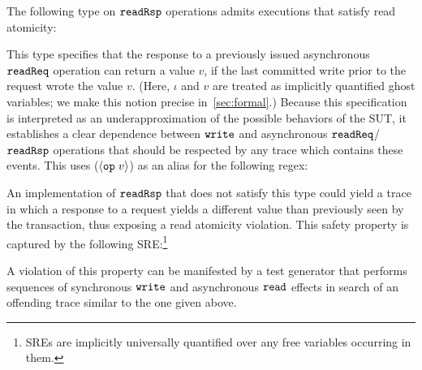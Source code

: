   The following \tyName{} type on $\boldsymbol{{\tt readRsp}}$
  operations admits executions that satisfy read atomicity:
  \vspace{-.4cm} \par{}\vspace{-.5cm} \par\nobreak\noindent
This type specifies that the response to a previously issued
asynchronous $\boldsymbol{{\tt readReq}}$ operation can return a value $v$, if the
last committed write prior to the request wrote the value $v$. (Here,
$\iota$ and $v$ are treated as implicitly quantified ghost variables;
we make this notion precise in~\autoref{sec:formal}.)
Because this specification is
interpreted as an underapproximation of the possible behaviors of the
SUT, it establishes a clear dependence between $\boldsymbol{{\tt write}}$
and asynchronous $\boldsymbol{{\tt readReq}}$/$\boldsymbol{{\tt readRsp}}$ operations that should be respected by any
trace which contains these events.  This \tyName{} uses
(${\langle} {\boldsymbol{{\tt op}}\;{v}} {\rangle}$) as an alias for the following regex:
\vspace{-.4cm} \par{}\vspace{-.5cm} \par\nobreak\noindent %
An implementation of $\boldsymbol{{\tt readRsp}}$ that does not satisfy this type
could yield a trace in which a response to a request yields a
different value than previously seen by the transaction, thus exposing
a read atomicity violation.  This safety property is captured by the
following SRE:\footnote{SREs are implicitly universally quantified
  over any free variables occurring in them.}%
\vspace{-.4cm} \par{}
\vspace{-.5cm} \par\nobreak\noindent
A violation of this property can be manifested by a test
generator that performs sequences of synchronous $\boldsymbol{{\tt write}}$ and
asynchronous $\boldsymbol{{\tt read}}$ effects in search of an offending trace
similar to the one given above.

